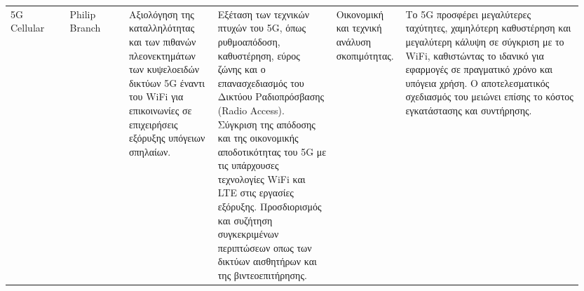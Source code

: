 \begin{landscape}
\begin{longtable}{p{0.1\linewidth}p{0.1\linewidth}p{0.15\linewidth}p{0.20\linewidth}p{0.1\linewidth}p{0.3\linewidth}}
        5G Cellular & Philip Branch \cite{branch_fifth_2021} & Αξιολόγηση της καταλληλότητας και των πιθανών
        πλεονεκτημάτων των κυψελοειδών δικτύων 5G έναντι του WiFi για επικοινωνίες σε επιχειρήσεις εξόρυξης 
        υπόγειων σπηλαίων. &
        Εξέταση των τεχνικών πτυχών του 5G, όπως ρυθμοαπόδοση, καθυστέρηση, εύρος ζώνης και ο επανασχεδιασμός 
        του Δικτύου Ραδιοπρόσβασης (Radio Access). Σύγκριση της απόδοσης και της οικονομικής αποδοτικότητας 
        του 5G με τις υπάρχουσες τεχνολογίες WiFi και LTE στις εργασίες εξόρυξης. Προσδιορισμός και συζήτηση 
        συγκεκριμένων περιπτώσεων οπως των δικτύων αισθητήρων και της βιντεοεπιτήρησης.&
        Οικονομική και τεχνική ανάλυση σκοπιμότητας.&
        Το 5G προσφέρει μεγαλύτερες ταχύτητες, χαμηλότερη καθυστέρηση και μεγαλύτερη κάλυψη σε σύγκριση με το WiFi,
        καθιστώντας το ιδανικό για εφαρμογές σε πραγματικό χρόνο και υπόγεια χρήση. Ο αποτελεσματικός σχεδιασμός 
        του μειώνει επίσης το κόστος εγκατάστασης και συντήρησης.\\
    \end{longtable}
\end{landscape}
